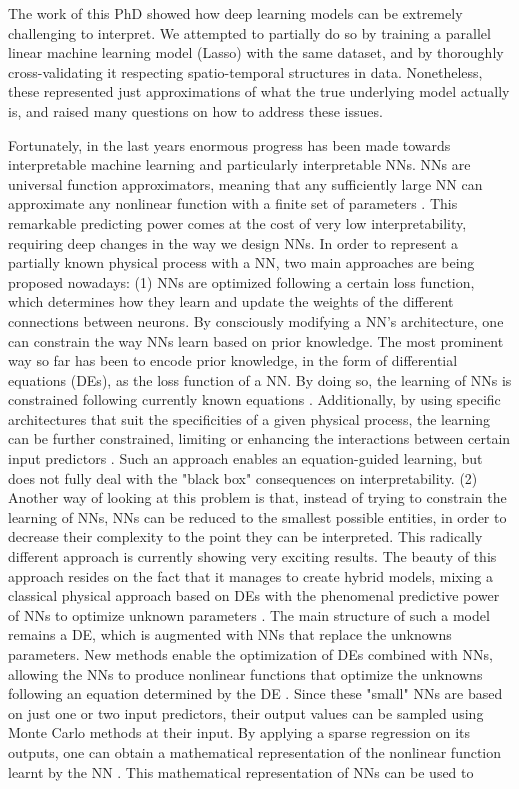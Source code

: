 The work of this PhD showed how deep learning models can be extremely challenging to interpret. We attempted to partially do so by training a parallel linear machine learning model (Lasso) with the same dataset, and by thoroughly cross-validating it respecting spatio-temporal structures in data. Nonetheless, these represented just approximations of what the true underlying model actually is, and raised many questions on how to address these issues. 

Fortunately, in the last years enormous progress has been made towards interpretable machine learning and particularly interpretable NNs. NNs are universal function approximators, meaning that any sufficiently large NN can approximate any nonlinear function with a finite set of parameters \citep{winkler_performance_2017}. This remarkable predicting power comes at the cost of very low interpretability, requiring deep changes in the way we design NNs. In order to represent a partially known physical process with a NN, two main approaches are being proposed nowadays: (1) NNs are optimized following a certain loss function, which determines how they learn and update the weights of the different connections between neurons. By consciously modifying a NN's architecture, one can constrain the way NNs learn based on prior knowledge. The most prominent way so far has been to encode prior knowledge, in the form of differential equations (DEs), as the loss function of a NN. By doing so, the learning of NNs is constrained following currently known equations \citep{raissi_physics_2017,karpatne_physics-guided_2018}. Additionally, by using specific architectures that suit the specificities of a given physical process, the learning can be further constrained, limiting or enhancing the interactions between certain input predictors \citep{karpatne_theory-guided_2017}. Such an approach enables an equation-guided learning, but does not fully deal with the "black box" consequences on interpretability. (2) Another way of looking at this problem is that, instead of trying to constrain the learning of NNs, NNs can be reduced to the smallest possible entities, in order to decrease their complexity to the point they can be interpreted. This radically different approach is currently showing very exciting results. The beauty of this approach resides on the fact that it manages to create hybrid models, mixing a classical physical approach based on DEs with the phenomenal predictive power of NNs to optimize unknown parameters \citep{rackauckas_universal_2020}. The main structure of such a model remains a DE, which is augmented with NNs that replace the unknowns parameters. New methods enable the optimization of DEs combined with NNs, allowing the NNs to produce nonlinear functions that optimize the unknowns following an equation determined by the DE \citep{raissi_physics_2017,rackauckas_universal_2020,bradbury_jax_2020}. Since these "small" NNs are based on just one or two input predictors, their output values can be sampled using Monte Carlo methods at their input. By applying a sparse regression on its outputs, one can obtain a mathematical representation of the nonlinear function learnt by the NN \citep{brunton_discovering_2016}. This mathematical representation of NNs can be used to 